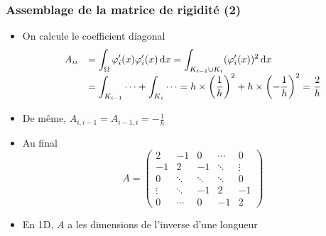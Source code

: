 \documentclass{beamer}
\def \de {{\rm d}}
\begin{document}
\begin{frame}
\frametitle{Assemblage de la matrice de rigidité (2)}
\begin{itemize}
\item On calcule le coefficient diagonal
\[\begin{array}{ll}
A_{ii}&=\displaystyle \int_{\Omega}\varphi'_i(x)\varphi'_i(x)\,\de x=\int_{K_{i-1}\cup K_i}(\varphi'_i(x))^2\,\de x\\
&=\displaystyle \int_{K_{i-1}}\cdots+\int_{K_{i}}\cdots=h\times \left(\frac 1h\right)^2+h\times \left(-\frac 1h\right)^2=\frac 2h
\end{array}
\]
\item De même, $A_{i,i-1}=A_{i-1,i}=-\frac 1h$
\item Au final
\[A=\left(\begin{array}{ccccc}
2 & -1 & 0 &\cdots & 0 \\
-1 & 2 & -1& \ddots & \vdots  \\
0 & \ddots  & \ddots & \ddots & 0 \\
\vdots & \ddots  & -1 & 2 & -1  \\
0 & \cdots  & 0 & -1 & 2 
\end{array}\right)\]
\item En 1D, $A$ a les dimensions de l'inverse d'une longueur
\end{itemize}


\end{frame}
\end{document}
